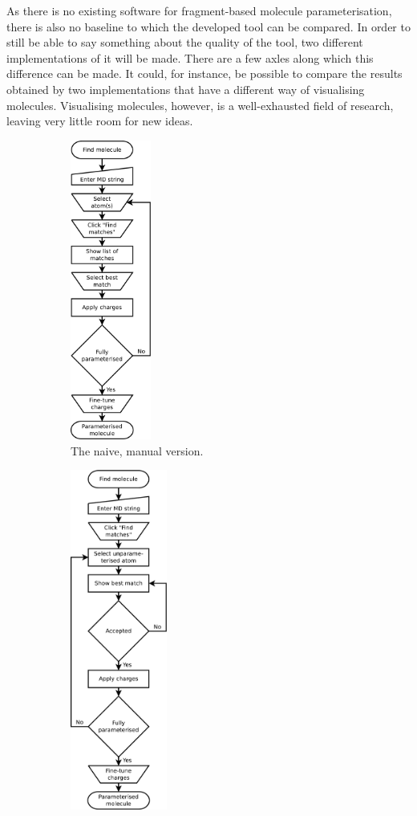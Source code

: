 
As there is no existing software for fragment-based molecule parameterisation, there is also no baseline to which the developed tool can be compared. In order to still be able to say something about the quality of the tool, two different implementations of it will be made. There are a few axles along which this difference can be made. It could, for instance, be possible to compare the results obtained by two implementations that have a different way of visualising molecules. Visualising molecules, however, is a well-exhausted field of research, leaving very little room for new ideas.

\begin{figure}[h!]
\centering
\begin{subfigure}[t]{0.47\textwidth}
\centering
\includegraphics[width=100px]{img/manual_id.pdf}
\caption{The naive, manual version.}
\end{subfigure}%
\qquad
\begin{subfigure}[t]{0.47\textwidth}
\centering
\includegraphics[width=120px]{img/semiauto_id.pdf}

\end{subfigure}
\end{figure}
